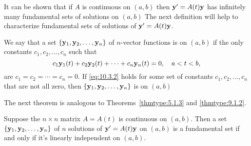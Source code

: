 \documentclass{ximera}
\begin{document}
It can be shown that if $A$ is continuous on $(a,b)$ then ${\bf
y}'=A(t){\bf y}$ has infinitely many fundamental sets of solutions on
$(a,b)$ %
The next
definition will help to characterize fundamental sets of solutions of
${\bf y}'=A(t){\bf y}$.


We say that a set $\{{\bf y}_1,{\bf y}_2,\dots,{\bf y}_n\}$ of
$n$-vector functions is  on $(a,b)$ if the
only constants $c_1, c_2, \dots, c_n$ such that
\begin{equation} \label{eq:10.3.2}
 c_1{\bf y}_1(t)+c_2{\bf y}_2(t)+\cdots+c_n{\bf y}_n(t)=0,\quad
a<t<b,
\end{equation}
are $c_1=c_2=\cdots=c_n=0$. If \eqref{eq:10.3.2} holds for some set of
constants $c_1, c_2, \dots, c_n$ that are not all zero, then $\{{\bf
y}_1,{\bf y}_2,\dots,{\bf y}_n\}$ is  on
$(a,b)$

The next theorem is analogous to
Theorems~\ref{thmtype:5.1.3} and
\ref{thmtype:9.1.2}.

\begin{theorem}\label{thmtype:10.3.1}
Suppose the $n\times n$ matrix $A=A(t)$ is continuous on $(a,b)$.
Then a set
$\{{\bf y}_1,{\bf y}_2,\dots,{\bf y}_n\}$ of $n$ solutions of ${\bf
y}'=A(t){\bf y}$ on $(a,b)$ is a fundamental set if and only if it's
linearly independent on $(a,b)$.
\end{theorem}
\end{document}
